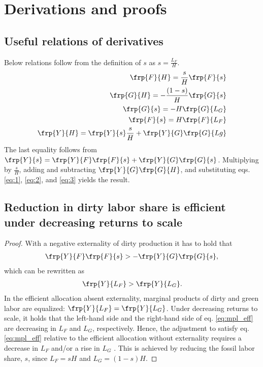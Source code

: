 \clearpage
\appendix
\section{Derivations and proofs}\label{app:derivations}

\subsection{Useful relations of derivatives}\label{app:dervs_use}
Below relations follow from the definition of $s$ as $s=\frac{L_F}{H}$.
\begin{align}
\frp{F}{H}=\frac{s}{H}\frp{F}{s}\label{eq:1}\\
\frp{G}{H}=-\frac{(1-s)}{H}\frp{G}{s}\label{eq:2}\\
\frp{G}{s}=-H\frp{G}{L_G}\label{eq:3}\\
\frp{F}{s}=H\frp{F}{L_F}\nonumber\\
\frp{Y}{H}= \frp{Y}{s}\frac{s}{H}+\frp{Y}{G}\frp{G}{Lg}\nonumber
\end{align}
The last equality follows from $\frp{Y}{s}=\frp{Y}{F}\frp{F}{s}+\frp{Y}{G}\frp{G}{s}$. Multiplying by $\frac{s}{H}$, adding and subtracting $\frp{Y}{G}\frp{G}{H}$, and substituting eqs. \eqref{eq:1}, \eqref{eq:2}, and \eqref{eq:3} yields the result. 
\subsection{Reduction in dirty labor share is efficient under decreasing returns to scale}\label{app:redeffs}
\begin{proof}
	With a negative externality of dirty production it has to hold that 
	\begin{align*}
	\frp{Y}{F}\frp{F}{s}>-\frp{Y}{G}\frp{G}{s},
	\end{align*}
	which can be rewritten as 
	\begin{align}\label{eq:mpl_eff}
	\frp{Y}{L_F}>\frp{Y}{L_G}. 
	\end{align}
	In the efficient allocation absent externality, marginal products of dirty and green labor are equalized: $\frp{Y}{L_F}=\frp{Y}{L_G}$. 
	Under decreasing returns to scale, it holds that the left-hand side and the right-hand side of eq. \eqref{eq:mpl_eff} are decreasing in $L_F$ and $L_G$, respectively. Hence, the adjustment to satisfy eq. \eqref{eq:mpl_eff} relative to the efficient allocation without externality requires a decrease in $L_F$ and/or a rise in $L_G$  .
	This is achieved by reducing the fossil labor share, $s$, since $L_F=sH$ and $L_G=(1-s)H$.	
\end{proof}


